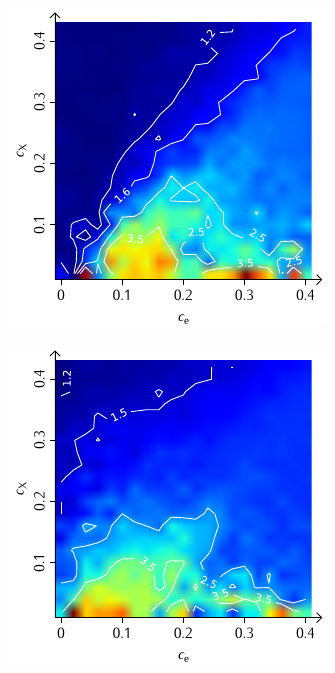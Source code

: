 \documentclass[a4paper, 10pt, twoside, openany]{book} %
\begin{document}
\begin{figure}
\begin{minipage}[t]{0.48\textwidth}
        \label{F_penalty_cluster_D}
    \end{minipage}
    \begin{minipage}[t]{0.48\textwidth}
        \includegraphics[width=\textwidth]{Abbildungen/Phasendiagramme/Konturen/F_random_D.pdf}
        \label{F_random_D}
    \end{minipage}
    \hfill
    \begin{minipage}[t]{0.48\textwidth}
        \includegraphics[width=\textwidth]{Abbildungen/Phasendiagramme/Konturen/F_penalty_random_D.pdf}

\end{minipage}
\end{figure}
\end{document}
